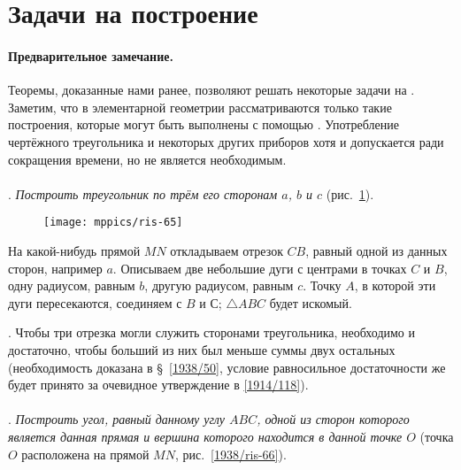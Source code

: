 \section{Задачи на построение}

\paragraph{Предварительное замечание.}\label{1938/61}
Теоремы, доказанные нами ранее, позволяют решать некоторые задачи на .
Заметим, что в элементарной геометрии рассматриваются только такие построения, которые могут быть выполнены с помощью .
Употребление чертёжного треугольника и некоторых других приборов хотя и допускается ради сокращения времени, но не является необходимым.

\paragraph{}\label{1938/62}
.
\emph{Построить треугольник по трём его сторонам $a$, $b$ и $c$} (рис.~\ref{1938/ris-65}).

\begin{figure}[!ht]
\centering
\texttt{[image: mppics/ris-65]}
\caption{}\label{1938/ris-65}
\end{figure}

На какой-нибудь прямой $MN$ откладываем отрезок $CB$, равный одной из данных сторон, например $a$.
Описываем две небольшие дуги с центрами в точках $C$ и $B$, одну радиусом, равным $b$, другую радиусом, равным $c$.
Точку $A$, в которой эти дуги пересекаются, соединяем с $B$ и С;
$\triangle ABC$ будет искомый.

{\small

\smallskip
{}.
Чтобы три отрезка могли служить сторонами треугольника, необходимо и достаточно, чтобы больший из них был меньше суммы двух остальных (необходимость доказана в §~\ref{1938/50}, условие равносильное достаточности же будет принято за очевидное утверждение в \ref{1914/118}).

}

\paragraph{}\label{1938/63}
.
\emph{Построить угол, равный данному углу $ABC$, одной из сторон которого является данная прямая и вершина которого находится в данной точке $O$} (точка $O$ расположена на прямой $MN$, рис.~\ref{1938/ris-66}).

